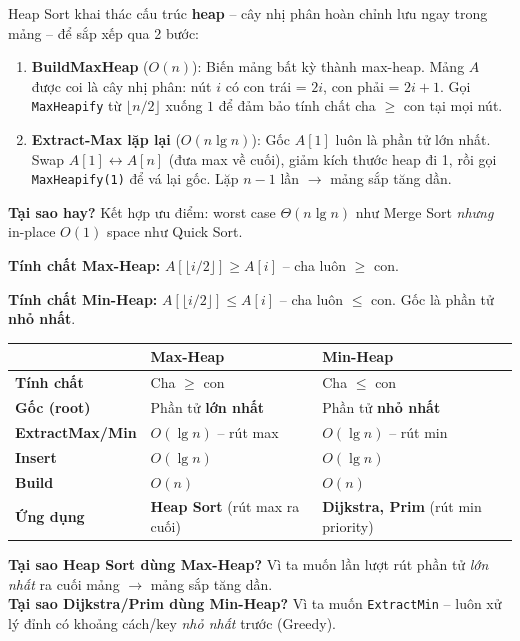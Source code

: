 \documentclass[10pt]{article}
\begin{document}
Heap Sort khai thác cấu trúc \textbf{heap} -- cây nhị phân hoàn chỉnh lưu ngay trong mảng -- để sắp xếp qua 2 bước:

\begin{enumerate}
\item \textbf{BuildMaxHeap} ($O(n)$): Biến mảng bất kỳ thành max-heap. Mảng $A$ được coi là cây nhị phân: nút $i$ có con trái = $2i$, con phải = $2i+1$. Gọi \texttt{MaxHeapify} từ $\lfloor n/2 \rfloor$ xuống $1$ để đảm bảo tính chất cha $\geq$ con tại mọi nút.
\item \textbf{Extract-Max lặp lại} ($O(n\lg n)$): Gốc $A[1]$ luôn là phần tử lớn nhất. Swap $A[1] \leftrightarrow A[n]$ (đưa max về cuối), giảm kích thước heap đi 1, rồi gọi \texttt{MaxHeapify(1)} để vá lại gốc. Lặp $n-1$ lần $\to$ mảng sắp tăng dần.
\end{enumerate}

\textbf{Tại sao hay?} Kết hợp ưu điểm: worst case $\Theta(n\lg n)$ như Merge Sort \textit{nhưng} in-place $O(1)$ space như Quick Sort.

\textbf{Tính chất Max-Heap:} $A[\lfloor i/2 \rfloor] \geq A[i]$ -- cha luôn $\geq$ con.

\textbf{Tính chất Min-Heap:} $A[\lfloor i/2 \rfloor] \leq A[i]$ -- cha luôn $\leq$ con. Gốc là phần tử \textbf{nhỏ nhất}.

\begin{tcolorbox}[colback=blue!3, colframe=blue!40, boxrule=0.5pt, arc=2pt, title={\small\textbf{So sánh Min-Heap vs Max-Heap}}]
\begin{tabular}{|l|l|l|}
\hline
 & \textbf{Max-Heap} & \textbf{Min-Heap} \\
\hline
\textbf{Tính chất} & Cha $\geq$ con & Cha $\leq$ con \\
\hline
\textbf{Gốc (root)} & Phần tử \textbf{lớn nhất} & Phần tử \textbf{nhỏ nhất} \\
\hline
\textbf{ExtractMax/Min} & $O(\lg n)$ -- rút max & $O(\lg n)$ -- rút min \\
\hline
\textbf{Insert} & $O(\lg n)$ & $O(\lg n)$ \\
\hline
\textbf{Build} & $O(n)$ & $O(n)$ \\
\hline
\textbf{Ứng dụng} & \textbf{Heap Sort} (rút max ra cuối) & \textbf{Dijkstra, Prim} (rút min priority) \\
\hline
\end{tabular}
\vspace{0.2cm}

\textbf{Tại sao Heap Sort dùng Max-Heap?} Vì ta muốn lần lượt rút phần tử \textit{lớn nhất} ra cuối mảng $\to$ mảng sắp tăng dần.\\
\textbf{Tại sao Dijkstra/Prim dùng Min-Heap?} Vì ta muốn \texttt{ExtractMin} -- luôn xử lý đỉnh có khoảng cách/key \textit{nhỏ nhất} trước (Greedy).
\end{tcolorbox}
\end{document}
